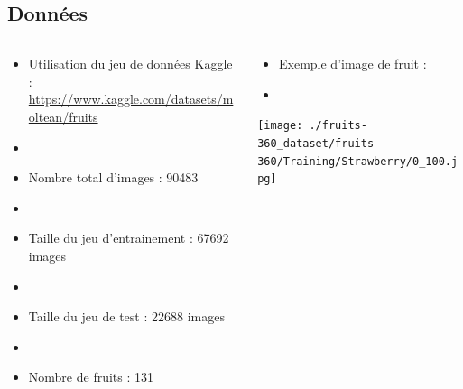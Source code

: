 \documentclass[8pt,aspectratio=169,hyperref={unicode=true}]{beamer}
\begin{document}
\subsection{Données}
\begin{frame}{\insertsubsection}
  \begin{columns}
    \begin{column}{.6\textwidth}
      \begin{itemize}
        \item Utilisation du jeu de données Kaggle : \url{https://www.kaggle.com/datasets/moltean/fruits}
        \item[]
        \item Nombre total d'images : 90483
        \item[]
        \item Taille du jeu d'entrainement : 67692 images
        \item[]
        \item Taille du jeu de test : 22688 images
        \item[]
        \item  Nombre de fruits : 131
      \end{itemize}
    \end{column}
    \begin{column}{.4\textwidth}
      \begin{itemize}
        \item Exemple d'image de fruit :
        \item[]
      \end{itemize}
      \center
      \texttt{[image: ./fruits-360\_dataset/fruits-360/Training/Strawberry/0\_100.jpg]}
    \end{column}
  \end{columns}
\end{frame}
\end{document}
